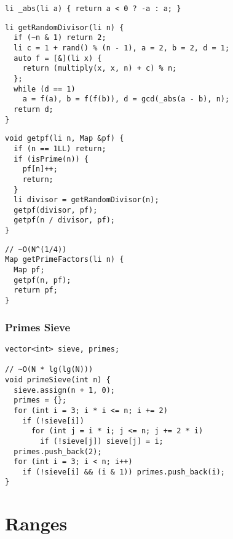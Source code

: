 \documentclass[twoside]{article}
\begin{document}
\begin{multicols*}{2}
\begin{verbatim}
li _abs(li a) { return a < 0 ? -a : a; }
\end{verbatim}
\vspace{-12pt}
\begin{verbatim}
li getRandomDivisor(li n) {
  if (~n & 1) return 2;
  li c = 1 + rand() % (n - 1), a = 2, b = 2, d = 1;
  auto f = [&](li x) {
    return (multiply(x, x, n) + c) % n;
  };
  while (d == 1)
    a = f(a), b = f(f(b)), d = gcd(_abs(a - b), n);
  return d;
}
\end{verbatim}
\vspace{-12pt}
\begin{verbatim}
void getpf(li n, Map &pf) {
  if (n == 1LL) return;
  if (isPrime(n)) {
    pf[n]++;
    return;
  }
  li divisor = getRandomDivisor(n);
  getpf(divisor, pf);
  getpf(n / divisor, pf);
}
\end{verbatim}
\vspace{-12pt}
\begin{verbatim}
// ~O(N^(1/4))
Map getPrimeFactors(li n) {
  Map pf;
  getpf(n, pf);
  return pf;
}
\end{verbatim}

\subsubsectionfont{\large\bfseries\sffamily\underline}
\subsubsection*{Primes Sieve}
\begin{verbatim}
vector<int> sieve, primes;

// ~O(N * lg(lg(N)))
void primeSieve(int n) {
  sieve.assign(n + 1, 0);
  primes = {};
  for (int i = 3; i * i <= n; i += 2)
    if (!sieve[i])
      for (int j = i * i; j <= n; j += 2 * i)
        if (!sieve[j]) sieve[j] = i;
  primes.push_back(2);
  for (int i = 3; i < n; i++)
    if (!sieve[i] && (i & 1)) primes.push_back(i);
}
\end{verbatim}

\sectionfont{\bfseries\sffamily\centering\Huge}
\vspace{1em}
\section*{Ranges}
\vspace{3em}
\subsectionfont{\bfseries\sffamily\centering\LARGE}
\vspace{0em}

\end{multicols*}
\end{document}
